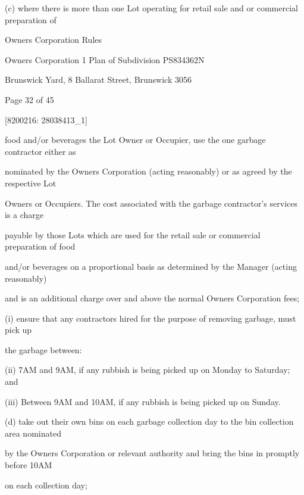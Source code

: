 \documentclass{article}
\begin{document}
{\fontsize{9.962}{1}(c) where there is more than one Lot operating for retail sale and or commercial preparation of }

\newpage





{\fontsize{9}{1}Owners Corporation Rules }

{\fontsize{9}{1}Owners Corporation 1 Plan of Subdivision PS834362N }

{\fontsize{9}{1}Brunswick Yard, 8 Ballarat Street, Brunswick 3056 }


{\fontsize{9}{1}Page 32  of 45 }



{\fontsize{7.02}{1}[8200216: 28038413\_1] }

{\fontsize{10.02}{1}food and/or beverages the Lot Owner or Occupier, use the one garbage contractor either as }

{\fontsize{10.02}{1}nominated by the Owners Corporation (acting reasonably) or as agreed by the respective Lot }

{\fontsize{10.02}{1}Owners or Occupiers. The cost associated with the garbage contractor’s services is a charge }

{\fontsize{10.02}{1}payable by those Lots which are used for the retail sale or commercial preparation of food }

{\fontsize{10.02}{1}and/or beverages on a proportional basis as determined by the Manager (acting reasonably) }

{\fontsize{10.02}{1}and is an additional charge over and above the normal Owners Corporation fees; }

{\fontsize{9.962}{1}(i) ensure that any contractors hired for the purpose of removing garbage, must pick up }

{\fontsize{10.02}{1}the garbage between: }

{\fontsize{9.962}{1}(ii) 7AM and 9AM, if any rubbish is being picked up on Monday to Saturday; and }


{\fontsize{9.962}{1}(iii) Between 9AM and 10AM, if any rubbish is being picked up on Sunday. }

{\fontsize{9.962}{1}(d) take out their own bins on each garbage collection day to the bin collection area nominated }

{\fontsize{10.02}{1}by the Owners Corporation or relevant authority and bring the bins in promptly before 10AM }

{\fontsize{10.02}{1}on each collection day; }
\end{document}

